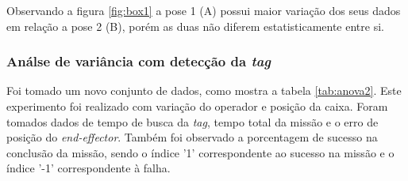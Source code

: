Observando a figura \ref*{fig:box1} a pose 1 (A) possui maior variação dos seus dados em relação a pose 2 (B), porém as duas não diferem estatisticamente entre si. 

\subsubsection{Análse de variância com detecção da \textit{tag}}

Foi tomado um novo conjunto de dados, como mostra a tabela \ref*{tab:anova2}. Este experimento foi realizado com variação do operador e posição da caixa. Foram tomados dados de tempo de busca da \textit{tag}, tempo total da missão e o erro de posição do \textit{end-effector}. Também foi observado a porcentagem de sucesso na conclusão da missão, sendo o índice '1' correspondente ao sucesso na missão e o índice '-1' correspondente à falha. 

